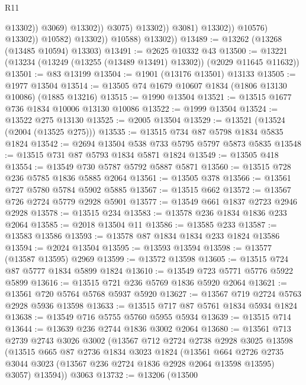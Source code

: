 \begin{lexlean}{R11}
\begin{coremodule}
                                            @13302))
                                        @3069)
                                      @13302))
                                  @3075)
                                @13302))
                            @3081)
                          @13302))
                      @10576)
                    @13302))
                @10582)
              @13302))
          @10588)
        @13302))
@13489 := @13262 (@13268 (@13485 @10594) @13303)
@13491 := @2625 @10332 @43
@13500 := @13221 (@13234 (@13249 (@13255 (@13489 @13491) @13302)) (@2029 @11645 @11632))
@13501 := @83 @13199
@13504 := @1901 (@13176 @13501) @13133
@13505 := @1977 @13504
@13514 := @13505 @74 @1679 @10607 @1834 (@1806 @13130 @10086) (@1885 @13216)
@13515 := @1990 @13504
@13521 := @13515 @1677 @736 @1834 @10006 @13130 @10086
@13522 := @1999 @13504
@13524 := @13522 @275 @13130
@13525 := @2005 @13504
@13529 := @13521 (@13524 (@2004 (@13525 @275)))
@13535 := @13515 @734 @87 @5798 @1834 @5835 @1824
@13542 := @2694 @13504 @538 @733 @5795 @5797 @5873 @5835
@13548 := @13515 @731 @87 @5793 @1834 @5871 @1824
@13549 := @13505 @418
@13554 := @13549 @730 @5787 @5792 @5887 @5871
@13560 := @13515 @728 @236 @5785 @1836 @5885 @2064
@13561 := @13505 @378
@13566 := @13561 @727 @5780 @5784 @5902 @5885
@13567 := @13515 @662
@13572 := @13567 @726 @2724 @5779 @2928 @5901
@13577 := @13549 @661 @1837 @2723 @2946 @2928
@13578 := @13515 @234
@13583 := @13578 @236 @1834 @1836 @233 @2064
@13585 := @2018 @13504 @11
@13586 := @13585 @233
@13587 := @13583 @13586
@13593 := @13578 @87 @1834 @1834 @233 @1824 @13586
@13594 := @2024 @13504
@13595 := @13593 @13594
@13598 := @13577 (@13587 @13595) @2969
@13599 := @13572 @13598
@13605 := @13515 @724 @87 @5777 @1834 @5899 @1824
@13610 := @13549 @723 @5771 @5776 @5922 @5899
@13616 := @13515 @721 @236 @5769 @1836 @5920 @2064
@13621 := @13561 @720 @5764 @5768 @5937 @5920
@13627 := @13567 @719 @2724 @5763 @2928 @5936 @13598
@13633 := @13515 @717 @87 @5761 @1834 @5934 @1824
@13638 := @13549 @716 @5755 @5760 @5955 @5934
@13639 := @13515 @714
@13644 := @13639 @236 @2744 @1836 @3002 @2064
@13680 := @13561
    @713
    @2739
    @2743
    @3026
    @3002
    (@13567
      @712
      @2724
      @2738
      @2928
      @3025
      @13598
      (@13515
        @665
        @87
        @2736
        @1834
        @3023
        @1824
        (@13561
          @664
          @2726
          @2735
          @3044
          @3023
          (@13567 @236 @2724 @1836 @2928 @2064 @13598 @13595)
          @3057)
        @13594))
    @3063
@13732 := @13206
    (@13500

\end{coremodule}
\end{lexlean}
